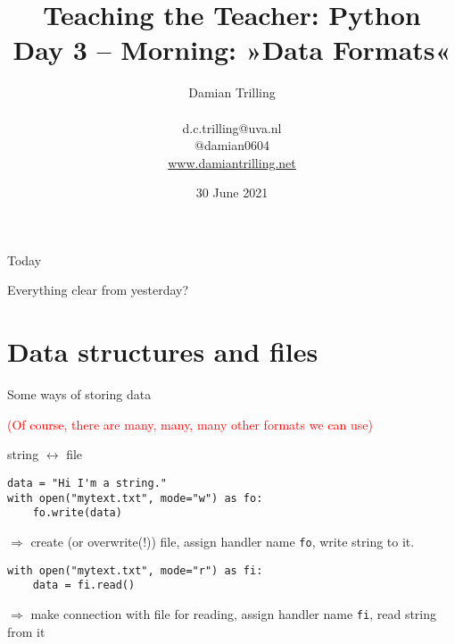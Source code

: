 \documentclass[compress]{beamer}
\title[Big Data and Automated Content Analysis]{\textbf{Teaching the Teacher: Python} \\ Day 3 -- Morning: »Data Formats«}
\author[Damian Trilling]{Damian Trilling \\ ~ \\ \footnotesize{d.c.trilling@uva.nl \\@damian0604} \\ \url{www.damiantrilling.net}}
\date{30 June 2021}
\institute[UvA]{Afdeling Communicatiewetenschap \\Universiteit van Amsterdam}
\begin{document}
\begin{frame}{}
\titlepage
\end{frame}

\begin{frame}{Today}
\tableofcontents
\end{frame}


\begin{frame}[standout]
Everything clear from yesterday?
\end{frame}





\section{Data structures and files}


\begin{frame}{Some ways of storing data}
\begin{table}[]
\end{table}
\pause
\textcolor{red}{\footnotesize{(Of course, there are many, many, many other formats we can use)}}
\end{frame}




\begin{frame}[fragile]{string $\leftrightarrow$ file}
\begin{lstlisting}
data = "Hi I'm a string."
with open("mytext.txt", mode="w") as fo:
    fo.write(data)
\end{lstlisting}
$\Rightarrow$ create (or overwrite(!)) file, assign handler name \texttt{fo}, write string to it.

\pause 
\begin{lstlisting}
with open("mytext.txt", mode="r") as fi:
    data = fi.read()
\end{lstlisting}

$\Rightarrow$ make connection with file for reading, assign handler name \texttt{fi}, read string from it

\pause

\end{frame}
\end{document}

